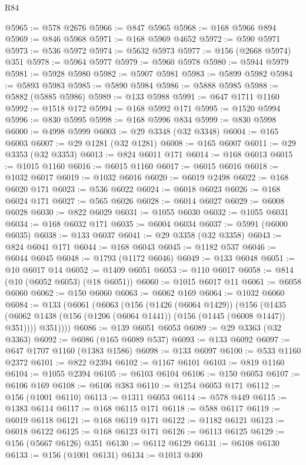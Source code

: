 \begin{lexlean}{R84}
\begin{coremodule}
@5965 := @578 @2676
@5966 := @847 @5965
@5968 := @168 @5966 @894
@5969 := @846 @5968
@5971 := @168 @5969 @4652
@5972 := @590 @5971
@5973 := @536 @5972
@5974 := @5632 @5973
@5977 := @156 (@2668 @5974) @351
@5978 := @5964 @5977
@5979 := @5960 @5978
@5980 := @5944 @5979
@5981 := @5928 @5980
@5982 := @5907 @5981
@5983 := @5899 @5982
@5984 := @5893 @5983
@5985 := @5890 @5984
@5986 := @5888 @5985
@5988 := @5882 (@5885 @5986)
@5989 := @133 @5988
@5991 := @647 @1711 @1160
@5992 := @1518 @172
@5994 := @168 @5992 @171
@5995 := @1520 @5994
@5996 := @830 @5995
@5998 := @168 @5996 @834
@5999 := @830 @5998
@6000 := @4998 @5999
@6003 := @29 @3348 (@32 @3348)
@6004 := @165 @6003
@6007 := @29 @1281 (@32 @1281)
@6008 := @165 @6007
@6011 := @29 @3353 (@32 @3353)
@6013 := @824 @6011 @171
@6014 := @168 @6013
@6015 := @1015 @1160
@6016 := @6015 @1160
@6017 := @6015 @6016
@6018 := @1032 @6017
@6019 := @1032 @6016
@6020 := @6019 @2498
@6022 := @168 @6020 @171
@6023 := @536 @6022
@6024 := @6018 @6023
@6026 := @168 @6024 @171
@6027 := @565 @6026
@6028 := @6014 @6027
@6029 := @6008 @6028
@6030 := @822 @6029
@6031 := @1055 @6030
@6032 := @1055 @6031
@6034 := @168 @6032 @171
@6035 := @6004 @6034
@6037 := @5991 (@6000 @6035)
@6038 := @133 @6037
@6041 := @29 @3358 (@32 @3358)
@6043 := @824 @6041 @171
@6044 := @168 @6043
@6045 := @1182 @537
@6046 := @6044 @6045
@6048 := @1793 (@1172 @6046)
@6049 := @133 @6048
@6051 := @10 @6017 @14
@6052 := @1409 @6051
@6053 := @110 @6017
@6058 := @814 (@10 (@6052 @6053) (@18 @6051))
@6060 := @1015 @6017 @11
@6061 := @6058 @6060
@6062 := @150 @6060
@6063 := @6062 @169
@6064 := @1032 @6060
@6084 := @133
    (@6061
      (@6063
        (@156
          (@1426 (@6064 @1429))
          (@156
            (@1435 (@6062 @1438 (@156 (@1206 (@6064 @1441)) (@156 (@1445 (@6008 @1447)) @351))))
            @351))))
@6086 := @139 @6051 @6053
@6089 := @29 @3363 (@32 @3363)
@6092 := @6086 (@165 @6089 @537)
@6093 := @133 @6092
@6097 := @647 @1707 @1160 (@1383 @1586)
@6098 := @133 @6097
@6100 := @533 @1160 @2372
@6101 := @822 @2394
@6102 := @1167 @6101
@6103 := @819 @1160
@6104 := @1055 @2394
@6105 := @6103 @6104
@6106 := @150 @6053
@6107 := @6106 @169
@6108 := @6106 @383
@6110 := @1254 @6053 @171
@6112 := @156 (@1001 @6110)
@6113 := @1311 @6053
@6114 := @578 @449
@6115 := @1383 @6114
@6117 := @168 @6115 @171
@6118 := @588 @6117
@6119 := @6019 @6118
@6121 := @168 @6119 @171
@6122 := @1182 @6121
@6123 := @6018 @6122
@6125 := @168 @6123 @171
@6126 := @6113 @6125
@6129 := @156 (@5667 @6126) @351
@6130 := @6112 @6129
@6131 := @6108 @6130
@6133 := @156 (@1001 @6131)
@6134 := @1013 @400

\end{coremodule}
\end{lexlean}
